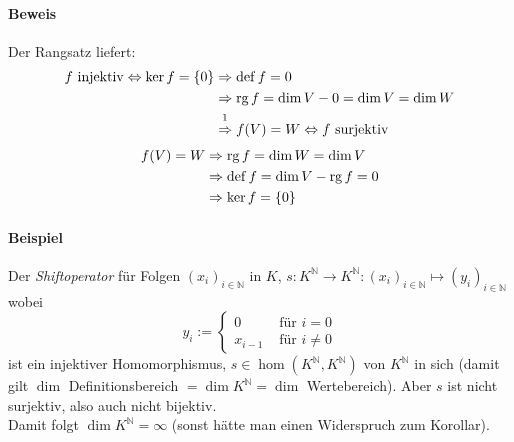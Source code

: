 	\paragraph{Beweis}
 		Der Rangsatz liefert:
 		\begin{align*}
 			f \text{ injektiv} \Leftrightarrow \ker f = \{{0\}} & \Rightarrow \dfkt f = 0                                                            \\
 			                                                    & \Rightarrow \rg f = \dim V-0 = \dim V = \dim W                                     \\
 			                                                    & \stackrel{\footnotemark}{\Rightarrow} f(V) = W \Leftrightarrow f \text{ surjektiv}
 		\end{align*}
 		\begin{align*}
 			f(V) = W & \Rightarrow \operatorname{rg} f = \dim W = \dim V   \\
 			         & \Rightarrow \operatorname{def} f= \dim V - \operatorname{rg} f=0 \\
 			         & \Rightarrow \ker f = \{{0}\}
 		\end{align*}

 	\paragraph{Beispiel}
 		Der \emph{Shiftoperator} für Folgen $(x_i)_{i\in \mathbb{N}}$ in $K$, $s: K^{\mathbb{N}} \to K^{\mathbb{N}}: (x_i)_{i\in \mathbb{N}} \mapsto (y_i)_{i\in \mathbb{N}}$ wobei
 		\begin{equation*}
 			y_i :=
 			\begin{cases}
 				0       & \text{ für } i = 0    \\
 				x_{i-1} & \text{ für } i \neq 0
 			\end{cases}
 		\end{equation*}
 		ist ein injektiver Homomorphismus, $s\in \hom(K^\mathbb{N},K^\mathbb{N})$ von $K^\mathbb{N}$ in sich (damit gilt $\dim $ Definitionsbereich $= \dim K^\mathbb{N}= \dim$ Wertebereich). Aber $s$ ist nicht surjektiv, also auch nicht bijektiv.\\
 		Damit folgt $\dim K^\mathbb{N} =\infty$ (sonst hätte man einen Widerspruch zum Korollar).

